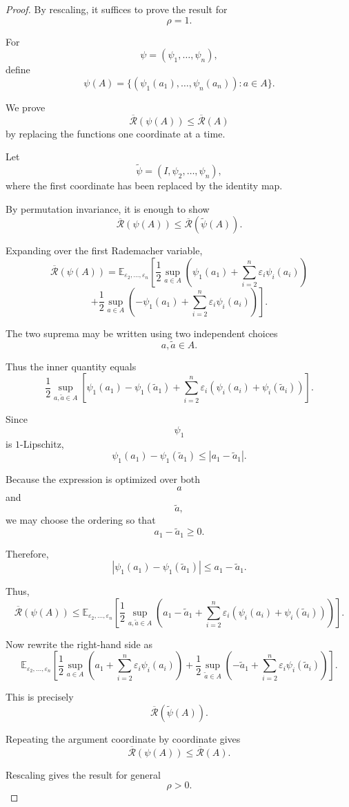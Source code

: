 \documentclass[12pt,oneside]{book}
\numberwithin{equation}{section}
\theoremstyle{definition}
\theoremstyle{plain}
\theoremstyle{remark}
\newcommand{\E}{\mathbb{E}}
\begin{document}
\begin{proof}
By rescaling, it suffices to prove the result for
\[
\rho=1.
\]

For
\[
\psi=(\psi_1,\dots,\psi_n),
\]
define
\[
\psi(A)
=
\{(\psi_1(a_1),\dots,\psi_n(a_n)):a\in A\}.
\]

We prove
\[
\overline{\mathcal{R}}(\psi(A))
\leq
\overline{\mathcal{R}}(A)
\]
by replacing the functions one coordinate at a time.

Let
\[
\widetilde{\psi}
=
(I,\psi_2,\dots,\psi_n),
\]
where the first coordinate has been replaced by the identity map.

By permutation invariance, it is enough to show
\[
\overline{\mathcal{R}}(\psi(A))
\leq
\overline{\mathcal{R}}(\widetilde{\psi}(A)).
\]

Expanding over the first Rademacher variable,
\[
\overline{\mathcal{R}}(\psi(A))
=
\E_{\varepsilon_2,\dots,\varepsilon_n}
\left[
\frac{1}{2}
\sup_{a\in A}
\left(
\psi_1(a_1)
+
\sum_{i=2}^n
\varepsilon_i\psi_i(a_i)
\right)
\right.
\]
\[
\left.
+
\frac{1}{2}
\sup_{a\in A}
\left(
-\psi_1(a_1)
+
\sum_{i=2}^n
\varepsilon_i\psi_i(a_i)
\right)
\right].
\]

The two suprema may be written using two independent choices
\[
a,\widetilde{a}\in A.
\]

Thus the inner quantity equals
\[
\frac{1}{2}
\sup_{a,\widetilde{a}\in A}
\left[
\psi_1(a_1)-\psi_1(\widetilde{a}_1)
+
\sum_{i=2}^n
\varepsilon_i
\left(
\psi_i(a_i)+\psi_i(\widetilde{a}_i)
\right)
\right].
\]

Since
\[
\psi_1
\]
is $1$-Lipschitz,
\[
\psi_1(a_1)-\psi_1(\widetilde{a}_1)
\leq
|a_1-\widetilde{a}_1|.
\]

Because the expression is optimized over both
\[
a
\]
and
\[
\widetilde{a},
\]
we may choose the ordering so that
\[
a_1-\widetilde{a}_1\geq0.
\]

Therefore,
\[
|\psi_1(a_1)-\psi_1(\widetilde{a}_1)|
\leq
a_1-\widetilde{a}_1.
\]

Thus,
\[
\overline{\mathcal{R}}(\psi(A))
\leq
\E_{\varepsilon_2,\dots,\varepsilon_n}
\left[
\frac{1}{2}
\sup_{a,\widetilde{a}\in A}
\left(
a_1-\widetilde{a}_1
+
\sum_{i=2}^n
\varepsilon_i
(\psi_i(a_i)+\psi_i(\widetilde{a}_i))
\right)
\right].
\]

Now rewrite the right-hand side as
\[
\E_{\varepsilon_2,\dots,\varepsilon_n}
\left[
\frac{1}{2}
\sup_{a\in A}
\left(
a_1+
\sum_{i=2}^n
\varepsilon_i\psi_i(a_i)
\right)
+
\frac{1}{2}
\sup_{\widetilde{a}\in A}
\left(
-\widetilde{a}_1+
\sum_{i=2}^n
\varepsilon_i\psi_i(\widetilde{a}_i)
\right)
\right].
\]

This is precisely
\[
\overline{\mathcal{R}}(\widetilde{\psi}(A)).
\]

Repeating the argument coordinate by coordinate gives
\[
\overline{\mathcal{R}}(\psi(A))
\leq
\overline{\mathcal{R}}(A).
\]

Rescaling gives the result for general
\[
\rho>0.
\]
\end{proof}
\end{document}

